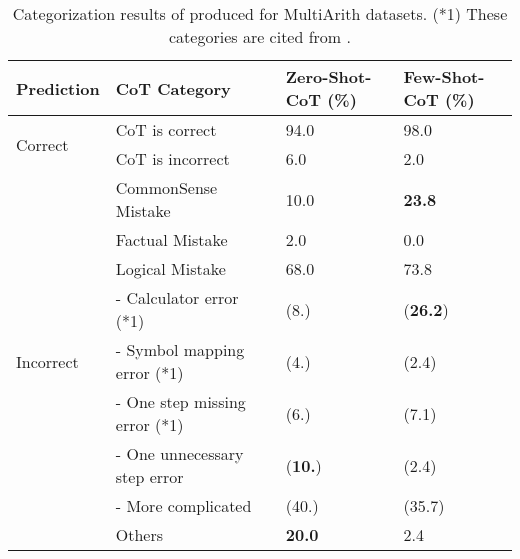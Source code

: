 \begin{table}[h]
\centering
\captionsetup{width=.94\textwidth}
\caption{Categorization results of produced \CoT for MultiArith datasets. 
(*1) These categories are cited from \cite{cot_wei}.
}
\label{tab:analysis_multiarith}
\begin{tabular}{p{}p{}p{}p{}}
\toprule
Prediction &CoT Category &Zero-Shot-CoT (\%) &Few-Shot-CoT (\%) \\\midrule \midrule
\multirow{2}{*}{Correct} &CoT is correct &94.0 &98.0 \\
&CoT is incorrect &6.0 &2.0 \\

\midrule

\multirow{9}{*}{Incorrect} &CommonSense Mistake &10.0 &\textbf{23.8} \\
&Factual Mistake &2.0 &0.0 \\
&Logical Mistake &68.0 &73.8 \\
& - Calculator error (*1) & (8.) &(\textbf{26.2}) \\
& - Symbol mapping error (*1) & (4.) & (2.4) \\
& - One step missing error (*1) & (6.) & (7.1) \\
& - One unnecessary step error &(\textbf{10.}) & (2.4) \\
& - More complicated & (40.) & (35.7) \\
&Others &\textbf{20.0} &2.4 \\
\bottomrule
\end{tabular}
\end{table}

